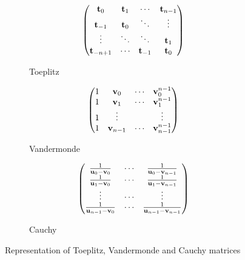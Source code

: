 \begin{figure}[t]
   \centering
   \begin{subfigure}[b]{0.32\textwidth}
       \centering
       \begin{equation*}
	  \begin{pmatrix}
	    \mathbf{t}_0      & \mathbf{t}_1 & \cdots     & \mathbf{t}_{n-1} \\
	    \mathbf{t}_{-1}   & \mathbf{t}_0 & \ddots     & \vdots      \\
	    \vdots       & \ddots  & \ddots     & \mathbf{t}_1     \\
	    \mathbf{t}_{-n+1} & \cdots  & \mathbf{t}_{-1} & \mathbf{t}_0
	  \end{pmatrix}
       \end{equation*}
       \caption*{Toeplitz}
   \end{subfigure}
   \hfill
   \begin{subfigure}[b]{0.32\textwidth}
       \centering
       \begin{equation*}
	  \begin{pmatrix}
	    1 & \mathbf{v}_0     & \cdots & \mathbf{v}_0^{n-1} \\
	    1 & \mathbf{v}_1     & \cdots & \mathbf{v}_1^{n-1} \\
	    1 & \vdots      &        & \vdots        \\
	    1 & \mathbf{v}_{n-1} & \cdots & \mathbf{v}_{n-1}^{n-1}
	  \end{pmatrix}
       \end{equation*}
       \caption*{Vandermonde}
   \end{subfigure}
   \hfill
   \begin{subfigure}[b]{0.32\textwidth}
       \centering
       \begin{equation*}
	  \begin{pmatrix}
	  \frac{1}{\mathbf{u}_0 - \mathbf{v}_{0}}     & \cdots & \frac{1}{\mathbf{u}_0 - \mathbf{v}_{n-1}} \\
	  \frac{1}{\mathbf{u}_1 - \mathbf{v}_{0}}     & \cdots & \frac{1}{\mathbf{u}_1 - \mathbf{v}_{n-1}} \\
	  \vdots                            & \cdots & \vdots                          \\
	  \frac{1}{\mathbf{u}_{n-1} - \mathbf{v}_{0}} & \cdots & \frac{1}{\mathbf{u}_{n-1} - \mathbf{v}_{n-1}}
	  \end{pmatrix}
       \end{equation*}
       \caption*{Cauchy}
   \end{subfigure}
   \caption{Representation of Toeplitz, Vandermonde and Cauchy matrices}
  \label{figure:ch3-example_structure_matrices}
\end{figure}


\drawstar



